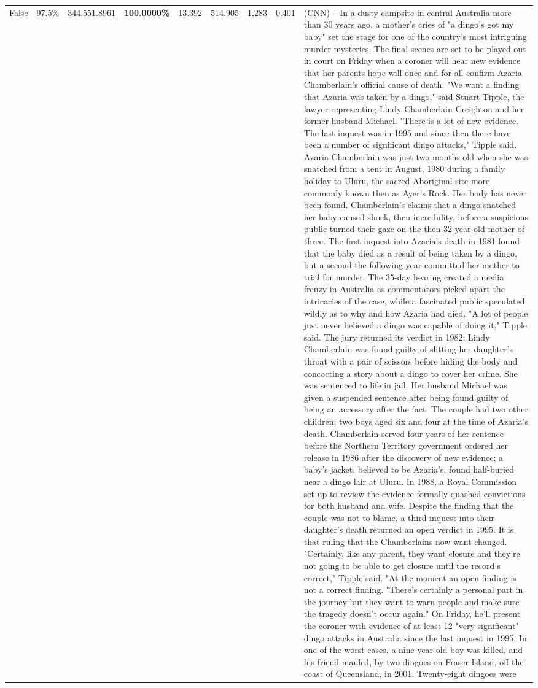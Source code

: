 \begin{table}[H]
\begin{tabular}{lllrlllll}
False & 97.5\% & 344,551.8961 & \bfseries \color{red} 100.0000\% & 13.392 & 514.905 & 1,283 & 0.401 & (CNN) -- In a dusty campsite in central Australia more than 30 years ago, a mother's cries of "a dingo's got my baby" set the stage for one of the country's most intriguing murder mysteries. The final scenes are set to be played out in court on Friday when a coroner will hear new evidence that her parents hope will once and for all confirm Azaria Chamberlain's official cause of death. "We want a finding that Azaria was taken by a dingo," said Stuart Tipple, the lawyer representing Lindy Chamberlain-Creighton and her former husband Michael. "There is a lot of new evidence. The last inquest was in 1995 and since then there have been a number of significant dingo attacks," Tipple said. Azaria Chamberlain was just two months old when she was snatched from a tent in August, 1980 during a family holiday to Uluru, the sacred Aboriginal site more commonly known then as Ayer's Rock. Her body has never been found. Chamberlain's claims that a dingo snatched her baby caused shock, then incredulity, before a suspicious public turned their gaze on the then 32-year-old mother-of-three. The first inquest into Azaria's death in 1981 found that the baby died as a result of being taken by a dingo, but a second the following year committed her mother to trial for murder. The 35-day hearing created a media frenzy in Australia as commentators picked apart the intricacies of the case, while a fascinated public speculated wildly as to why and how Azaria had died. "A lot of people just never believed a dingo was capable of doing it," Tipple said. The jury returned its verdict in 1982; Lindy Chamberlain was found guilty of slitting her daughter's throat with a pair of scissors before hiding the body and concocting a story about a dingo to cover her crime. She was sentenced to life in jail. Her husband Michael was given a suspended sentence after being found guilty of being an accessory after the fact. The couple had two other children; two boys aged six and four at the time of Azaria's death. Chamberlain served four years of her sentence before the Northern Territory government ordered her release in 1986 after the discovery of new evidence; a baby's jacket, believed to be Azaria's, found half-buried near a dingo lair at Uluru. In 1988, a Royal Commission set up to review the evidence formally quashed convictions for both husband and wife. Despite the finding that the couple was not to blame, a third inquest into their daughter's death returned an open verdict in 1995. It is that ruling that the Chamberlains now want changed. "Certainly, like any parent, they want closure and they're not going to be able to get closure until the record's correct," Tipple said. "At the moment an open finding is not a correct finding. "There's certainly a personal part in the journey but they want to warn people and make sure the tragedy doesn't occur again." On Friday, he'll present the coroner with evidence of at least 12 "very significant" dingo attacks in Australia since the last inquest in 1995. In one of the worst cases, a nine-year-old boy was killed, and his friend mauled, by two dingoes on Fraser Island, off the coast of Queensland, in 2001. Twenty-eight dingoes were 
\end{tabular}
\end{table}
